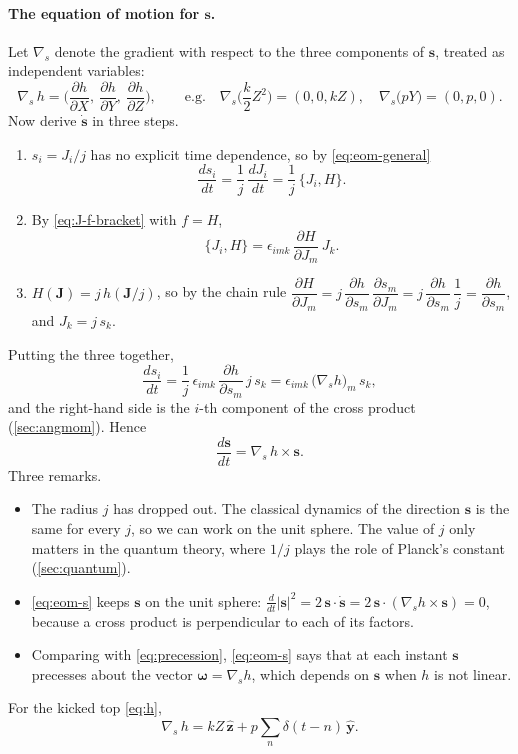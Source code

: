 \documentclass[11pt,a4paper]{article}
\newcommand{\vs}{\bm{s}}
\newcommand{\vJ}{\bm{J}}
\newcommand{\PB}[2]{\{#1,#2\}}
\begin{document}
\paragraph{The equation of motion for $\vs$.} Let $\nabla_{\!s}$ denote the gradient with respect to the three
components of $\vs$, treated as independent variables:
\begin{equation*}
  \nabla_{\!s}\, h = \Big(\frac{\partial h}{\partial X},\ \frac{\partial h}{\partial Y},\ \frac{\partial h}{\partial Z}\Big),
  \qquad\text{e.g.}\quad \nabla_{\!s}\Big(\frac k2 Z^2\Big) = (0, 0, kZ),\quad \nabla_{\!s}\big(pY\big) = (0, p, 0).
\end{equation*}
Now derive $\dot{\vs}$ in three steps.
\begin{enumerate}
  \item $s_i = J_i/j$ has no explicit time dependence, so by \eqref{eq:eom-general}
  \[ \frac{ds_i}{dt} = \frac1j\,\frac{dJ_i}{dt} = \frac1j\,\PB{J_i}{H}. \]
  \item By \eqref{eq:J-f-bracket} with $f = H$,
  \[ \PB{J_i}{H} = \epsilon_{imk}\,\frac{\partial H}{\partial J_m}\,J_k . \]
  \item $H(\vJ) = j\,h(\vJ/j)$, so by the chain rule $\dfrac{\partial H}{\partial J_m} = j\,\dfrac{\partial h}{\partial
  s_m}\,\dfrac{\partial s_m}{\partial J_m} = j\,\dfrac{\partial h}{\partial s_m}\,\dfrac1j = \dfrac{\partial h}{\partial
  s_m}$, and $J_k = j\,s_k$.
\end{enumerate}
Putting the three together,
\begin{equation*}
  \frac{ds_i}{dt} = \frac1j\,\epsilon_{imk}\,\frac{\partial h}{\partial s_m}\, j\,s_k
                 = \epsilon_{imk}\,\big(\nabla_{\!s} h\big)_m\, s_k ,
\end{equation*}
and the right-hand side is the $i$-th component of the cross product (\cref{sec:angmom}). Hence
\begin{equation}\label{eq:eom-s}
  \boxed{\frac{d\vs}{dt} = \nabla_{\!s}\, h \times \vs .}
\end{equation}
Three remarks.
\begin{itemize}
  \item The radius $j$ has dropped out. The classical dynamics of the direction $\vs$ is the same for every $j$, so we
  can work on the unit sphere. The value of $j$ only matters in the quantum theory, where $1/j$ plays the role of
  Planck's constant (\cref{sec:quantum}).
  \item \eqref{eq:eom-s} keeps $\vs$ on the unit sphere: $\frac{d}{dt}|\vs|^2 = 2\,\vs\cdot\dot{\vs} = 2\,\vs\cdot
  (\nabla_{\!s} h\times\vs) = 0$, because a cross product is perpendicular to each of its factors.
  \item Comparing with \eqref{eq:precession}, \eqref{eq:eom-s} says that at each instant $\vs$ precesses about the
  vector $\bm\omega = \nabla_{\!s} h$, which depends on $\vs$ when $h$ is not linear.
\end{itemize}
For the kicked top \eqref{eq:h},
\begin{equation}\label{eq:grad-h}
  \nabla_{\!s}\, h = kZ\,\hat{\bm z} + p\sum_n \delta(t-n)\,\hat{\bm y} .
\end{equation}
\end{document}
